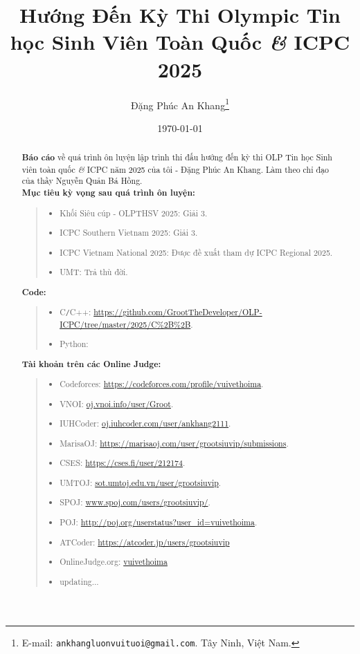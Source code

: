 \documentclass{article}
\title{Hướng Đến Kỳ Thi Olympic Tin học Sinh Viên Toàn Quốc {\it\&} ICPC 2025}
\author{Đặng Phúc An Khang\footnote{ E-mail: {\tt ankhangluonvuituoi@gmail.com}. Tây Ninh, Việt Nam.}}
\date{\today}
\begin{document}
\maketitle
\begin{abstract}
	\textbf{Báo cáo} về quá trình ôn luyện lập trình thi đấu hướng đến kỳ thi OLP Tin học Sinh viên toàn quốc {\it\&} ICPC năm 2025 của tôi - Đặng Phúc An Khang. Làm theo chỉ đạo của thầy Nguyễn Quản Bá Hồng.\\
	
	\textbf{Mục tiêu kỳ vọng sau quá trình ôn luyện:}
	\begin{quote}
	\begin{itemize}
		\item Khối Siêu cúp - OLPTHSV 2025: Giải 3.
		\item ICPC Southern Vietnam 2025: Giải 3.
		\item ICPC Vietnam National 2025: Được đề xuất tham dự ICPC Regional 2025.
		\item UMT: Trả thù đời.\\ 
	\end{itemize}
	\end{quote}
	
	\textbf{Code:}
	\begin{quote}
		\begin{itemize}
			\item C{\tt/}C++: \url{https://github.com/GrootTheDeveloper/OLP-ICPC/tree/master/2025/C%2B%2B}.
			\item Python: \url{}\\
		\end{itemize}
	\end{quote}
	
	\textbf{Tài khoản trên các Online Judge:}
	\begin{quote}
    	\begin{itemize}
			\item Codeforces: \url{https://codeforces.com/profile/vuivethoima}.
			\item VNOI: \url{oj.vnoi.info/user/Groot}.
			\item IUHCoder: \url{oj.iuhcoder.com/user/ankhang2111}.
			\item MarisaOJ: \url{https://marisaoj.com/user/grootsiuvip/submissions}.
			\item CSES: \url{https://cses.fi/user/212174}.
			\item UMTOJ: \url{sot.umtoj.edu.vn/user/grootsiuvip}.
			\item SPOJ: \url{www.spoj.com/users/grootsiuvip/}.
			\item POJ: \url{http://poj.org/userstatus?user_id=vuivethoima}.
			\item ATCoder: \url{https://atcoder.jp/users/grootsiuvip}
			\item OnlineJudge.org: \url{vuivethoima}
			\item updating...
		\end{itemize}
	\end{quote}
    
\end{abstract}
\tableofcontents
\end{document}
